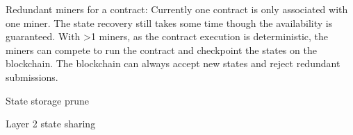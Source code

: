 \begin{icompact}
    \item Redundant miners for a contract: Currently one contract is only associated with one miner. The state recovery still takes some time though the availability is guaranteed. With >1 miners, as the contract execution is deterministic, the miners can compete to run the contract and checkpoint the states on the blockchain. The blockchain can always accept new states and reject redundant submissions.
    \item State storage prune
    \item Layer 2 state sharing
\end{icompact}
